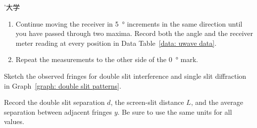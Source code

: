 ’大学\documentclass[addpoints]{physlabs}
\begin{document}
\begin{labsection}
\begin{experiment}
\begin{enumerate}
        \item Continue moving the receiver in \qty{5}{\degree} increments in the same direction until you have passed through two maxima. Record both the angle and the receiver meter reading at every position in Data Table~\ref{data: uwave data}.
        
        \item Repeat the measurements to the other side of the \qty{0}{\degree} mark.
    \end{enumerate}
    
\end{experiment}

\end{labsection}

\begin{postlab}


    \question[2] Sketch the observed fringes for double slit interference and single slit diffraction in Graph~\ref{graph: double slit patterns}.

    \begin{center}
    \captionsetup{font=normalsize}
    \end{center}

    \question[1] Record the double slit separation $d$, the screen-slit distance $L$, and the average separation between adjacent fringes $y$. Be sure to use the same units for all values.


\end{postlab}
\end{document}
